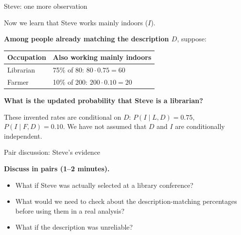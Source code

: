 \documentclass[10pt]{beamer}
\begin{document}
\begin{frame}{Steve: one more observation}

  Now we learn that Steve works mainly indoors ($I$).

  \textbf{Among people already matching the description $D$}, suppose:

  \begin{center}
    \begin{tabular}{ll}
      \hline
      Occupation & Also working mainly indoors \\
      \hline
      Librarian & 75\% of 80: $80\cdot0.75=60$ \\
      Farmer & 10\% of 200: $200\cdot0.10=20$ \\
      \hline
    \end{tabular}
  \end{center}

  \textbf{What is the updated probability that Steve is a librarian?}


  {\footnotesize These invented rates are conditional on $D$:
    $P(I\mid L,D)=0.75$, $P(I\mid F,D)=0.10$.
    We have not assumed that $D$ and $I$ are conditionally independent.}

\end{frame}


\begin{frame}{Pair discussion: Steve's evidence}

  {\color{uured}\textbf{Discuss in pairs (1--2 minutes).}}

  \begin{itemize}
  \item What if Steve was actually selected at a library conference?
  \item What would we need to check about the description-matching
    percentages before using them in a real analysis?
  \item What if the description was unreliable?
  \end{itemize}


\end{frame}
\end{document}
